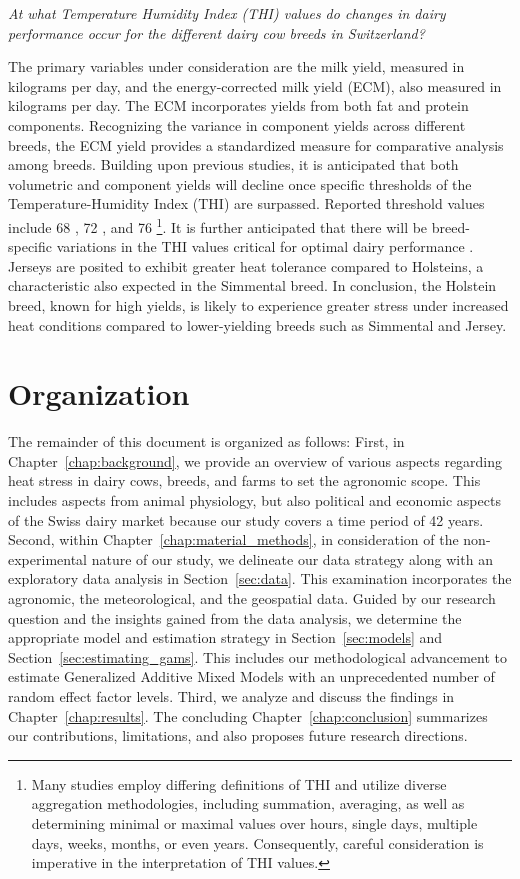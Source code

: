 \begin{center}
    \textit{At what Temperature Humidity Index (THI) values do changes in dairy performance occur for the different dairy cow breeds in Switzerland?}
\end{center}

The primary variables under consideration are the milk yield, measured in kilograms per day, and the energy-corrected milk yield (ECM), also measured in kilograms per day. The ECM incorporates yields from both fat and protein components. Recognizing the variance in component yields across different breeds, the ECM yield provides a standardized measure for comparative analysis among breeds. Building upon previous studies, it is anticipated that both volumetric and component yields will decline once specific thresholds of the Temperature-Humidity Index (THI) are surpassed. Reported threshold values include 68 \citep{de_rensis_seasonal_2015}, 72 \citep{armstrong_heat_1994}, and 76 \citep{vroege_effects_2023}\footnote{Many studies employ differing definitions of THI and utilize diverse aggregation methodologies, including summation, averaging, as well as determining minimal or maximal values over hours, single days, multiple days, weeks, months, or even years. Consequently, careful consideration is imperative in the interpretation of THI values.}. It is further anticipated that there will be breed-specific variations in the THI values critical for optimal dairy performance \citep{kadzere_heat_2002}. Jerseys are posited to exhibit greater heat tolerance compared to Holsteins, a characteristic also expected in the Simmental breed. In conclusion, the Holstein breed, known for high yields, is likely to experience greater stress under increased heat conditions compared to lower-yielding breeds such as Simmental and Jersey.

\section{Organization}
The remainder of this document is organized as follows: First, in Chapter~\ref{chap:background}, we provide an overview of various aspects regarding heat stress in dairy cows, breeds, and farms to set the agronomic scope. This includes aspects from animal physiology, but also political and economic aspects of the Swiss dairy market because our study covers a time period of 42 years. Second, within Chapter~\ref{chap:material_methods}, in consideration of the non-experimental nature of our study, we delineate our data strategy along with an exploratory data analysis in Section~\ref{sec:data}. This examination incorporates the agronomic, the meteorological, and the geospatial data. Guided by our research question and the insights gained from the data analysis, we determine the appropriate model and estimation strategy in Section~\ref{sec:models} and Section~\ref{sec:estimating_gams}. This includes our methodological advancement to estimate Generalized Additive Mixed Models with an unprecedented number of random effect factor levels. Third, we analyze and discuss the findings in Chapter~\ref{chap:results}. The concluding Chapter~\ref{chap:conclusion} summarizes our contributions, limitations, and also proposes future research directions.